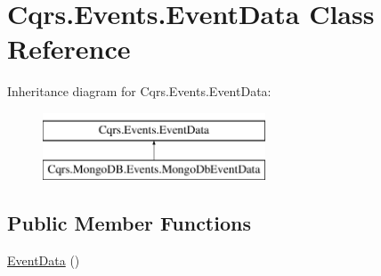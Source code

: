 \hypertarget{classCqrs_1_1Events_1_1EventData}{}\section{Cqrs.\+Events.\+Event\+Data Class Reference}
\label{classCqrs_1_1Events_1_1EventData}
Inheritance diagram for Cqrs.\+Events.\+Event\+Data\+:\begin{figure}[H]
\begin{center}
\leavevmode
\includegraphics[height=2.000000cm]{classCqrs_1_1Events_1_1EventData}
\end{center}
\end{figure}
\subsection*{Public Member Functions}
\begin{DoxyCompactItemize}
\item 
\hyperlink{classCqrs_1_1Events_1_1EventData_a0387ea22e5cdc085caf113a82f5ace18}{Event\+Data} ()
\end{DoxyCompactItemize}
